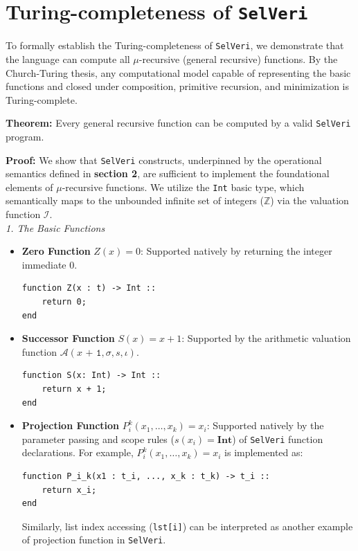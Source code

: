 \documentclass{article}
\begin{document}
\section{Turing-completeness of \texttt{SelVeri}}

To formally establish the Turing-completeness of \texttt{SelVeri}, we demonstrate that the language can compute all $\mu$-recursive (general recursive) functions. By the Church-Turing thesis, any computational model capable of representing the basic functions and closed under composition, primitive recursion, and minimization is Turing-complete. 

\textbf{Theorem:} Every general recursive function can be computed by a valid \texttt{SelVeri} program.

\textbf{Proof:} We show that \texttt{SelVeri} constructs, underpinned by the operational semantics defined in \textbf{section 2}, are sufficient to implement the foundational elements of $\mu$-recursive functions. We utilize the \texttt{Int} basic type, which semantically maps to the unbounded infinite set of integers ($\mathbb{Z}$) via the valuation function $\mathcal{I}$. \\

\textit{1. The Basic Functions}
\begin{itemize}
    \item \textbf{Zero Function} $Z(x) = 0$: Supported natively by returning the integer immediate $0$.
    \begin{verbatim}
function Z(x : t) -> Int ::
    return 0;
end
    \end{verbatim}
    
    \item \textbf{Successor Function} $S(x) = x + 1$: Supported by the arithmetic valuation function $\mathcal{A}(\texttt{$x$ + 1}, \sigma, s, \iota)$.
    \begin{verbatim}
function S(x: Int) -> Int ::
    return x + 1;
end
    \end{verbatim}
    
    \item \textbf{Projection Function} $P_i^k(x_1, \dots, x_k) = x_i$: Supported natively by the parameter passing and scope rules ($s(x_i) = \textbf{Int}$) of \texttt{SelVeri} function declarations. For example, $P_i^k(x_1, \dots, x_k) = x_i$ is implemented as:
    \begin{verbatim}
function P_i_k(x1 : t_i, ..., x_k : t_k) -> t_i ::
    return x_i;
end
    \end{verbatim}

    Similarly, list index accessing (\texttt{lst[i]}) can be interpreted as another example of projection function in \texttt{SelVeri}.
\end{itemize}
\end{document}
